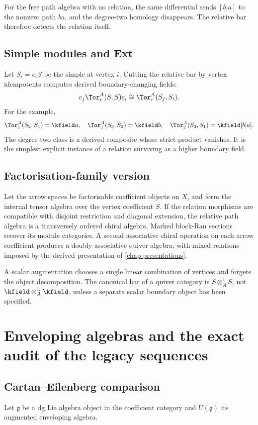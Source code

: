 For the free path algebra with no relation, the same differential sends \([b|a]\) to the nonzero path \(ba\), and the degree-two homology disappears.  The relative bar therefore detects the relation itself.

\section{Simple modules and Ext}
Let \(S_i=e_iS\) be the simple at vertex \(i\).  Cutting the relative bar by vertex idempotents computes derived boundary-changing fields:
\[
 e_j\Tor_r^A(S,S)e_i\cong\Tor_r^A(S_j,S_i).
\]
For the example,
\[
 \Tor_1^A(S_2,S_1)=\kfield a,
 \quad
 \Tor_1^A(S_3,S_2)=\kfield b,
 \quad
 \Tor_2^A(S_3,S_1)=\kfield[b|a].
\]
The degree-two class is a derived composite whose strict product vanishes.  It is the simplest explicit instance of a relation surviving as a higher boundary field.

\section{Factorisation-family version}
Let the arrow spaces be factorisable coefficient objects on \(X\), and form the internal tensor algebra over the vertex coefficient \(S\).  If the relation morphisms are compatible with disjoint restriction and diagonal extension, the relative path algebra is a transversely ordered chiral algebra.  Marked block-Ran sections recover its module categories.  A second associative chiral operation on each arrow coefficient produces a doubly associative quiver algebra, with mixed relations imposed by the derived presentation of \cref{chap:presentations}.

\begin{nogobox}[title={No-go theorem 14: multi-idempotent quivers require a relative base}]
A scalar augmentation chooses a single linear combination of vertices and forgets the object decomposition.  The canonical bar of a quiver category is \(S\otimes_A^{\mathbb L}S\), not \(\kfield\otimes_A^{\mathbb L}\kfield\), unless a separate scalar boundary object has been specified.
\end{nogobox}

\chapter{Enveloping algebras and the exact audit of the legacy sequences}\label{chap:enveloping}

\section{Cartan--Eilenberg comparison}
Let \(\mathfrak g\) be a dg Lie algebra object in the coefficient category and \(U(\mathfrak g)\) its augmented enveloping algebra.

